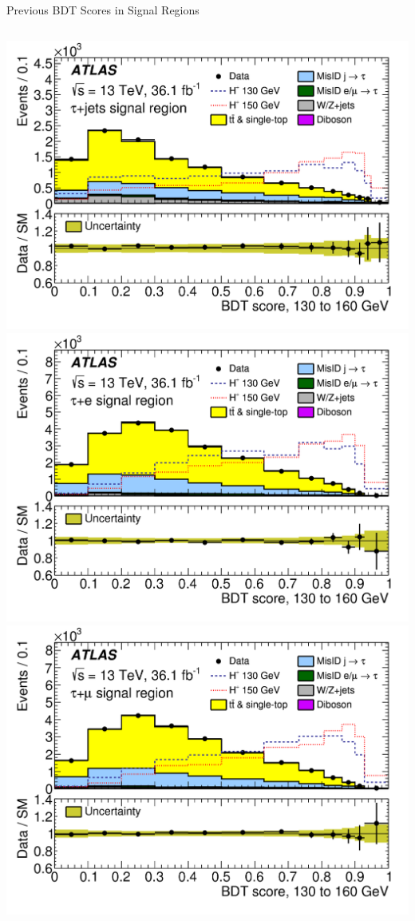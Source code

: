 \documentclass[aspectratio=169,xcolor=table]{beamer}
\begin{document}
\begin{frame}{Previous BDT Scores in Signal Regions}
\begin{columns}
          \includegraphics[height=.24\textheight,keepaspectratio=true]{taujet_SR_2018/taujet_SR_130to160_2018.png}
          \includegraphics[height=.24\textheight,keepaspectratio=true]{tauel_SR_2018/tauel_SR_130to160_2018.png}
          \includegraphics[height=.24\textheight,keepaspectratio=true]{taumu_SR_2018/taumu_SR_130to160_2018.png}


\end{columns}
\end{frame}
\end{document}
